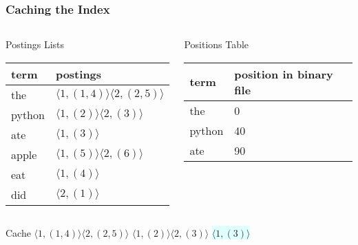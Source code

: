 \documentclass{beamer}
\begin{document}
\begin{frame}
  \frametitle{Caching the Index}

  \begin{columns}


    \begin{block}{Postings Lists}
      \begin{tabular}{ l | l }
        term & postings \\ \hline
        the & $ \langle 1,(1,4) \rangle \langle 2,(2,5) \rangle $ \\
        python & $ \langle 1,(2) \rangle \langle 2,(3) \rangle $ \\
        \rowcolor{LightCyan}
        ate & $ \langle 1,(3) \rangle $ \\
        apple & $ \langle 1,(5) \rangle \langle 2,(6) \rangle $ \\
        eat & $ \langle 1,(4) \rangle $ \\
        did & $ \langle 2,(1) \rangle $ \\
      \end{tabular}
    \end{block}


    \begin{block}{Positions Table}
      \begin{tabular}{ l | l }
        term & position in binary file \\ \hline
        the & 0 \\
        python & 40 \\
        \rowcolor{LightCyan}        
        ate & 90 \\
      \end{tabular}
    \end{block}
    
  \end{columns}

  \begin{block}{Cache}
    $ \langle 1,(1,4) \rangle \langle 2,(2,5) \rangle $
    $ \langle 1,(2) \rangle \langle 2,(3) \rangle $
    \colorbox{LightCyan}{$ \langle 1,(3) \rangle $}
  \end{block}
\end{frame}
\end{document}
